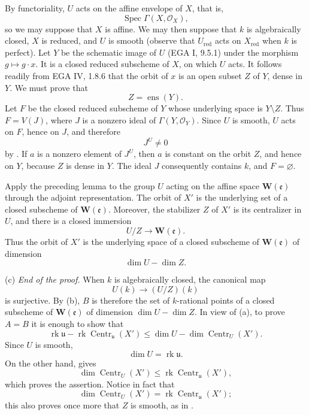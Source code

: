 By functoriality, \(U\) acts on the affine envelope of \(X\), that
is,
\[
  \operatorname{Spec}\Gamma(X,\mathcal O_X),
\]
so we may suppose that \(X\) is affine.  We may then suppose that
\(k\) is algebraically closed, \(X\) is reduced, and \(U\) is smooth
(observe that \(U_{\mathrm{red}}\) acts on \(X_{\mathrm{red}}\) when
\(k\) is perfect).  Let \(Y\) be the schematic image of \(U\)
(EGA I, 9.5.1) under the morphism \(g\mapsto g\cdot x\).  It is a
closed reduced subscheme of \(X\), on which \(U\) acts.  It follows
readily from EGA IV, 1.8.6 that the orbit of \(x\) is an open subset
\(Z\) of \(Y\), dense in \(Y\).  We must prove that
\[
  Z=\operatorname{ens}(Y).
\]
Let \(F\) be the closed reduced subscheme of \(Y\) whose underlying
space is \(Y\setminus Z\).  Thus \(F=V(J)\), where \(J\) is a
nonzero ideal of \(\Gamma(Y,\mathcal O_Y)\).  Since \(U\) is smooth,
\(U\) acts on \(F\), hence on \(J\), and therefore
\[
  J^U\ne0
\]
by .  If \(a\) is a nonzero element of \(J^U\), then \(a\) is
constant on the orbit \(Z\), and hence on \(Y\), because \(Z\) is
dense in \(Y\).  The ideal \(J\) consequently contains \(k\), and
\(F=\varnothing\).

Apply the preceding lemma to the group \(U\) acting on the affine
space \(\mathbf W(\mathfrak e)\) through the adjoint representation.
The orbit of \(X'\) is the underlying set of a closed subscheme of
\(\mathbf W(\mathfrak e)\).  Moreover, the stabilizer \(Z\) of
\(X'\) is its centralizer in \(U\), and there is a closed immersion
\[
  U/Z\longrightarrow\mathbf W(\mathfrak e).
\]
Thus the orbit of \(X'\) is the underlying space of a closed
subscheme of \(\mathbf W(\mathfrak e)\) of dimension
\[
  \dim U-\dim Z.
\]

\smallskip
\noindent
(c) \emph{End of the proof.}
When \(k\) is algebraically closed, the canonical map
\[
  U(k)\longrightarrow(U/Z)(k)
\]
is surjective.  By (b), \(B\) is therefore the set of \(k\)-rational
points of a closed subscheme of \(\mathbf W(\mathfrak e)\) of
dimension \(\dim U-\dim Z\).  In view of (a), to prove \(A=B\) it is
enough to show that
\[
  \operatorname{rk}\mathfrak u
  -\operatorname{rk}\operatorname{Centr}_{\mathfrak u}(X')
  \leq
  \dim U-\dim\operatorname{Centr}_U(X').
\]
Since \(U\) is smooth,
\[
  \dim U=\operatorname{rk}\mathfrak u.
\]
On the other hand,  gives
\[
  \dim\operatorname{Centr}_U(X')
  \leq
  \operatorname{rk}\operatorname{Centr}_{\mathfrak u}(X'),
\]
which proves the assertion.  Notice in fact that
\[
  \dim\operatorname{Centr}_U(X')
  =
  \operatorname{rk}\operatorname{Centr}_{\mathfrak u}(X');
\]
this also proves once more that \(Z\) is smooth, as in .

